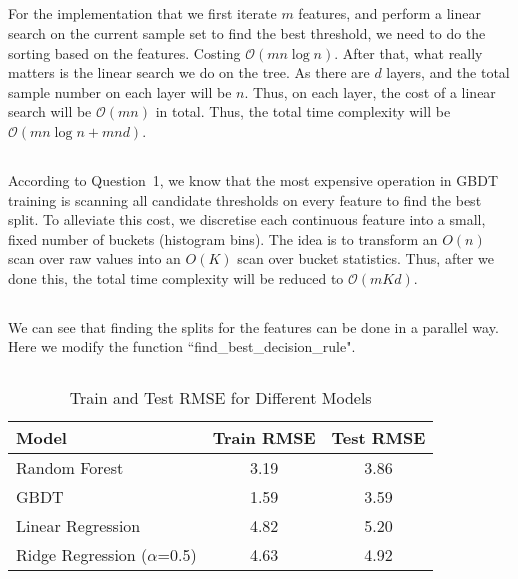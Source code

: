 \documentclass{article}
\begin{document}
\subsection{}
For the implementation that we first iterate $ m $ features, and perform a linear search on the current sample set to find the best threshold, we need to do the sorting based on the features. Costing $ \mathcal{O}(mn\log n) $. After that, what really matters is the linear search we do on the tree. As there are $ d $ layers, and the total sample number on each layer will be $ n $. Thus, on each layer, the cost of a linear search will be $ \mathcal{O}(mn) $ in total. Thus, the total time complexity will be $ \mathcal{O}(mn\log n + mnd) $.
\clearpage
\subsection{}
According to Question~1, we know that the most expensive operation in GBDT training is scanning all candidate thresholds on every feature to find the best split. To alleviate this cost, we discretise each continuous feature into a small, fixed number of buckets (histogram bins). The idea is to transform an $O(n)$ scan over raw values into an $O(K)$ scan over bucket statistics. Thus, after we done this, the total time complexity will be reduced to $ \mathcal{O}(mKd) $.
\subsection{}
We can see that finding the splits for the features can be done in a parallel way. Here we modify the function ``find\_best\_decision\_rule".
\subsection{}
\begin{table}[ht]
  \centering
  \caption{Train and Test RMSE for Different Models}
  \label{tab:rmse-comparison}
  \begin{tabular}{lcc}
    \toprule
    \textbf{Model}            & \textbf{Train RMSE} & \textbf{Test RMSE} \\
    \midrule
    Random Forest             & 3.19                & 3.86               \\
    GBDT        & 1.59 &3.59 \\ 
    Linear Regression         & 4.82                & 5.20               \\
    Ridge Regression ($\alpha$=0.5) & 4.63            & 4.92               \\
    \bottomrule
  \end{tabular}
\end{table}
\end{document}
